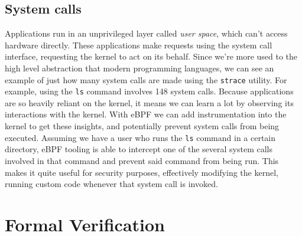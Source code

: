 \subsection{System calls}

Applications run in an unprivileged layer called \textit{user space}, which can't access hardware directly. These applications make requests using the system call interface, requesting the kernel to act on its behalf. Since we're more used to the high level abstraction that modern programming languages, we can see an example of just how many system calls are made using the \texttt{strace} utility. For example, using the \texttt{ls} command involves 148 system calls.
Because applications are so heavily reliant on the kernel, it means we can learn a lot by observing its interactions with the kernel. With eBPF we can add instrumentation into the kernel to get these insights, and potentially prevent system calls from being executed.
Assuming we have a user who runs the \texttt{ls} command in a certain directory, eBPF tooling is able to intercept one of the several system calls involved in that command and prevent said command from being run. This makes it quite useful for security purposes, effectively modifying the kernel, running custom code whenever that system call is invoked.


\section{Formal Verification}

